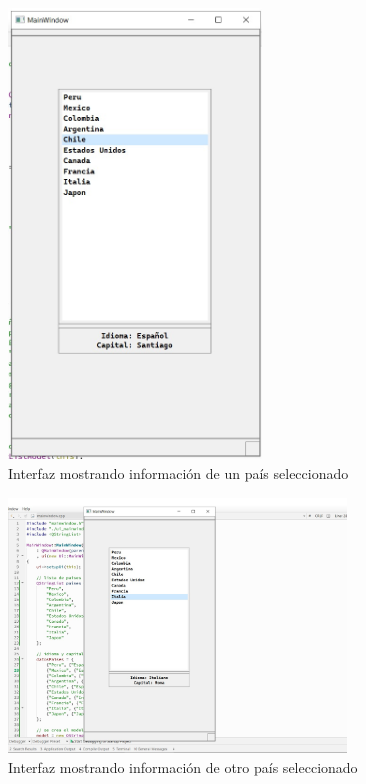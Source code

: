 \begin{figure}[H]
    \centering
    \includegraphics[width=0.6\textwidth]{img/Prueba02.jpg}
    \caption{Interfaz mostrando información de un país seleccionado}
\end{figure}

\begin{figure}[H]
    \centering
    \includegraphics[width=0.8\textwidth]{img/Prueba03.jpg}
    \caption{Interfaz mostrando información de otro país seleccionado}
\end{figure}

